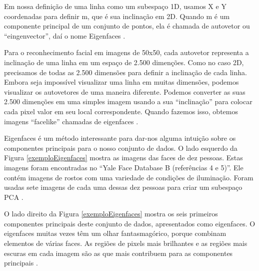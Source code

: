 Em nossa definição de uma linha como um subespaço 1D, usamos X e Y coordenadas para definir m, que é sua inclinação em 2D. Quando m é um componente principal de um conjunto de pontos, ela é chamada de autovetor ou ``eingenvector'', daí o nome Eigenfaces \cite{hewitt}. 

Para o reconhecimento facial em imagens de 50x50, cada autovetor representa a inclinação de uma linha em um espaço de 2.500 dimenções. Como no caso 2D, precisamos de todas as 2.500 dimensões para definir a inclinação de cada linha. Embora seja impossível visualizar uma linha em muitas dimensões, podemos visualizar os autovetores de uma maneira diferente. Podemos converter as suas 2.500 dimenções em uma simples imagem usando a sua ``inclinação'' para colocar cada pixel valor em seu local correspondente. Quando fazemos isso, obtemos imagens ``facelike'' chamadas de eigenfaces \cite{hewitt}.

Eigenfaces é um método interessante para dar-nos alguma intuição sobre os componentes principais para o nosso conjunto de dados. O lado esquerdo da Figura \ref{exemploEigenfaces} mostra as imagens das faces de dez pessoas. Estas imagens foram encontradas no ``Yale Face Database B (referências 4 e 5)''. Ele contém imagens de rostos com uma variedade de condições de iluminação. Foram usadas sete imagens de cada uma dessas dez pessoas para criar um subespaço PCA \cite{hewitt}. 

O lado direito da Figura \ref{exemploEigenfaces} mostra os seis primeiros componentes principais deste conjunto de dados, apresentados como eigenfaces. O eigenfaces muitas vezes têm um olhar fantasmagórico, porque combinam elementos de várias faces. As regiões de pixels mais brilhantes e as regiões mais escuras em cada imagem são as que mais contribuem para as componentes principais \cite{hewitt}. 

